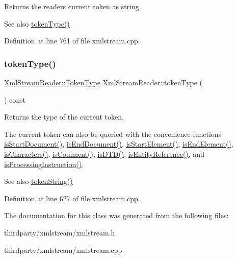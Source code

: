 Returns the reader\textquotesingle{}s current token as string.

\begin{DoxySeeAlso}{See also}
\hyperlink{class_xml_stream_reader_a2c26bfb63c27f2992e24f038d65c8c0a}{token\+Type()} 
\end{DoxySeeAlso}


Definition at line 761 of file xmlstream.\+cpp.

\mbox{\label{class_xml_stream_reader_a2c26bfb63c27f2992e24f038d65c8c0a}} 
\subsubsection{\texorpdfstring{token\+Type()}{tokenType()}}
{\footnotesize\ttfamily \hyperlink{class_xml_stream_reader_a99e2023f874f0ca648c996ae79c3b5f7}{Xml\+Stream\+Reader\+::\+Token\+Type} Xml\+Stream\+Reader\+::token\+Type (\begin{DoxyParamCaption}{ }\end{DoxyParamCaption}) const}

Returns the type of the current token.

The current token can also be queried with the convenience functions \hyperlink{class_xml_stream_reader_aa5a6f844839b4c7d893e3023f97feb4d}{is\+Start\+Document()}, \hyperlink{class_xml_stream_reader_a855b760b7aeec5b7fb177a88d9e7caee}{is\+End\+Document()}, \hyperlink{class_xml_stream_reader_a78cb57350cabab5e7ca7c1a8963a774d}{is\+Start\+Element()}, \hyperlink{class_xml_stream_reader_a4262447470b01b9544d1e83bf9521b35}{is\+End\+Element()}, \hyperlink{class_xml_stream_reader_a6d14d53c064bab08ac876ffaf2448742}{is\+Characters()}, \hyperlink{class_xml_stream_reader_ac3c807c55b3a957da46fe7c695cd7907}{is\+Comment()}, \hyperlink{class_xml_stream_reader_afd7dc97a37491da500428da151ca4913}{is\+D\+T\+D()}, \hyperlink{class_xml_stream_reader_ac7d9fbea5bf99934c5d862c8ced0d44f}{is\+Entity\+Reference()}, and \hyperlink{class_xml_stream_reader_a66b16a5ab385fbfa167295f41022c37d}{is\+Processing\+Instruction()}.

\begin{DoxySeeAlso}{See also}
\hyperlink{class_xml_stream_reader_a7e60a09f7692db1fccc420573b56c68b}{token\+String()} 
\end{DoxySeeAlso}


Definition at line 627 of file xmlstream.\+cpp.



The documentation for this class was generated from the following files\+:\begin{DoxyCompactItemize}
\item 
thirdparty/xmlstream/xmlstream.\+h\item 
thirdparty/xmlstream/xmlstream.\+cpp\end{DoxyCompactItemize}
